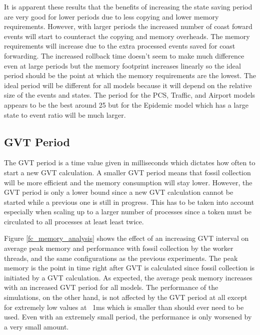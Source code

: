 \documentclass[11pt]{book}
\begin{document}
It is apparent these results that the benefits of increasing the state saving period are very good
for lower periods due to less copying and lower memory requirements. However, with larger periods
the increased number of coast foward events will start to counteract the copying and memory
overheads. The memory requirements will increase due to the extra processed events saved for
coast forwarding. The increased rollback time doesn't seem to make much difference even at large
periods but the memory footprint increases linearly so the ideal period should be the point at
which the memory requirements are the lowest. The ideal period will be different for all models
because it will depend on the relative size of the events and states. The period for the PCS,
Traffic, and Airport models appears to be the best around 25 but for the Epidemic model which
has a large state to event ratio will be much larger.

\subsection{GVT Period}

The GVT period is a time value given in milliseconds which dictates how often to start a new
GVT calculation. A smaller GVT period means that fossil collection will be more efficient and
the memory consumption will stay lower. However, the GVT period is only a lower bound since
a new GVT calculation cannot be started while a previous one is still in progress. This has to
be taken into account especially when scaling up to a larger number of processes since a token
must be circulated to all processes at least least twice.

Figure \ref{fc_memory_analysis} shows the effect of an increasing GVT interval on average peak
memory and performance with fossil collection by the worker threads, and the same configurations
as the previous experiments. The peak memory is the point in time right after GVT is calculated
since fossil collection is initiated by a GVT calculation. As expected, the average peak memory
increases with an increased GVT period for all models. The performance of the simulations, on
the other hand, is not affected by the GVT period at all except for extremely low values at ~1ms
which is smaller than should ever need to be used. Even with an extremely small period, the
performance is only worsened by a very small amount.
\end{document}
